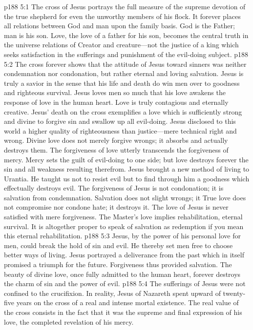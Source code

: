 \vs p188 5:1 The cross of Jesus portrays the full measure of the supreme devotion of the true shepherd for even the unworthy members of his flock. It forever places all relations between God and man upon the family basis. God is the Father; man is his son. Love, the love of a father for his son, becomes the central truth in the universe relations of Creator and creature---not the justice of a king which seeks satisfaction in the sufferings and punishment of the evil\hyp{}doing subject.
\vs p188 5:2 The cross forever shows that the attitude of Jesus toward sinners was neither condemnation nor condonation, but rather eternal and loving salvation. Jesus is truly a savior in the sense that his life and death do win men over to goodness and righteous survival. Jesus loves men so much that his love awakens the response of love in the human heart. Love is truly contagious and eternally creative. Jesus’ death on the cross exemplifies a love which is sufficiently strong and divine to forgive sin and swallow up all evil\hyp{}doing. Jesus disclosed to this world a higher quality of righteousness than justice---mere technical right and wrong. Divine love does not merely forgive wrongs; it absorbs and actually destroys them. The forgiveness of love utterly transcends the forgiveness of mercy. Mercy sets the guilt of evil\hyp{}doing to one side; but love destroys forever the sin and all weakness resulting therefrom. Jesus brought a new method of living to Urantia. He taught us not to resist evil but to find through him a goodness which effectually destroys evil. The forgiveness of Jesus is not condonation; it is salvation from condemnation. Salvation does not slight wrongs; it  True love does not compromise nor condone hate; it destroys it. The love of Jesus is never satisfied with mere forgiveness. The Master’s love implies rehabilitation, eternal survival. It is altogether proper to speak of salvation as redemption if you mean this eternal rehabilitation.
\vs p188 5:3 Jesus, by the power of his personal love for men, could break the hold of sin and evil. He thereby set men free to choose better ways of living. Jesus portrayed a deliverance from the past which in itself promised a triumph for the future. Forgiveness thus provided salvation. The beauty of divine love, once fully admitted to the human heart, forever destroys the charm of sin and the power of evil.
\pc \vs p188 5:4 The sufferings of Jesus were not confined to the crucifixion. In reality, Jesus of Nazareth spent upward of twenty\hyp{}five years on the cross of a real and intense mortal existence. The real value of the cross consists in the fact that it was the supreme and final expression of his love, the completed revelation of his mercy.
